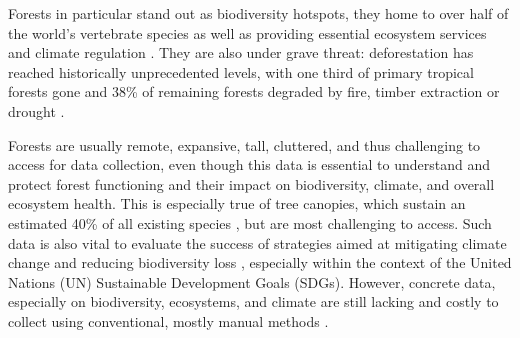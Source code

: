 

Forests in particular stand out as biodiversity hotspots, they home to over half of the world's vertebrate species \cite{Pillay2022} as well as providing essential ecosystem services and climate regulation \cite{Brockerhoff2017}. They are also under grave threat: deforestation has reached historically unprecedented levels, with one third of primary tropical forests gone \cite{Krogh2021} and 38\% of remaining forests degraded by fire, timber extraction or drought \cite{Lapola2023}.

Forests are usually remote, expansive, tall, cluttered, and thus challenging to access for data collection, even though this data is essential to understand and protect forest functioning and their impact on biodiversity, climate, and overall ecosystem health. This is especially true of tree canopies, which sustain an estimated 40\% of all existing species \cite{Ozanne2003d}, but are most challenging to access. Such data is also vital to evaluate the success of strategies aimed at mitigating climate change and reducing biodiversity loss \cite{Gonzalez2023}, especially within the context of the United Nations (UN) Sustainable Development Goals (SDGs). However, concrete data, especially on biodiversity, ecosystems, and climate are still lacking \cite{Goessmann2023} and costly to collect using conventional, mostly manual methods \cite{Cannon2021, UNEnvironment2019}. 

